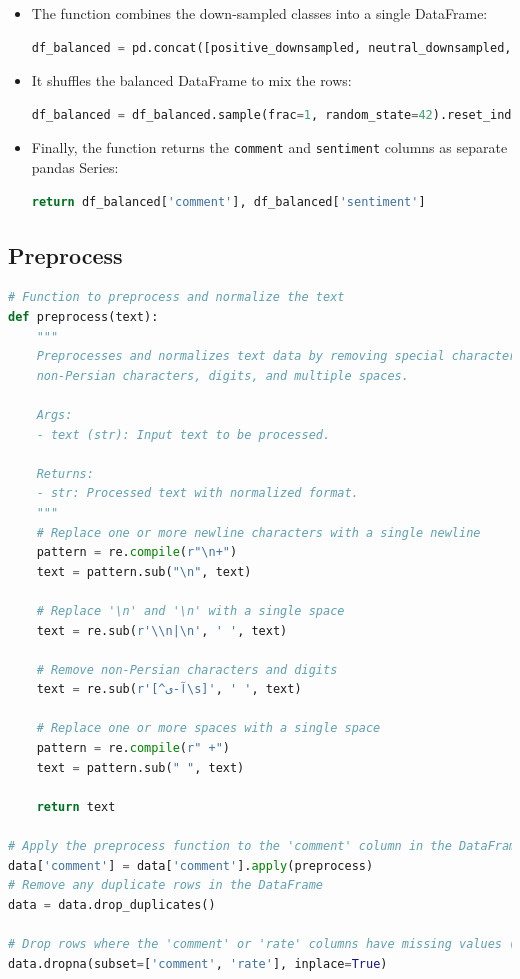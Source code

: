 \documentclass{solutionclass} %
\begin{document}
\begin{solution}
\begin{itemize}
	\item The function combines the down-sampled classes into a single DataFrame:
	\begin{lstlisting}[language=Python]
		df_balanced = pd.concat([positive_downsampled, neutral_downsampled, negative_downsampled])
	\end{lstlisting}
	
	\item It shuffles the balanced DataFrame to mix the rows:
	\begin{lstlisting}[language=Python]
		df_balanced = df_balanced.sample(frac=1, random_state=42).reset_index(drop=True)
	\end{lstlisting}
	
	\item Finally, the function returns the \texttt{comment} and \texttt{sentiment} columns as separate pandas Series:
	\begin{lstlisting}[language=Python]
		return df_balanced['comment'], df_balanced['sentiment']
	\end{lstlisting}
\end{itemize}
\end{solution}




\subsection*{Preprocess}


\begin{lstlisting}[language=Python]
	# Function to preprocess and normalize the text
def preprocess(text):
    """
    Preprocesses and normalizes text data by removing special characters,
    non-Persian characters, digits, and multiple spaces.

    Args:
    - text (str): Input text to be processed.

    Returns:
    - str: Processed text with normalized format.
    """
    # Replace one or more newline characters with a single newline
    pattern = re.compile(r"\n+")
    text = pattern.sub("\n", text)
    
    # Replace '\n' and '\n' with a single space
    text = re.sub(r'\\n|\n', ' ', text)
    
    # Remove non-Persian characters and digits
    text = re.sub(r'[^آ-ی\s]', ' ', text)
    
    # Replace one or more spaces with a single space
    pattern = re.compile(r" +")
    text = pattern.sub(" ", text)
    
    return text

# Apply the preprocess function to the 'comment' column in the DataFrame data
data['comment'] = data['comment'].apply(preprocess)
# Remove any duplicate rows in the DataFrame
data = data.drop_duplicates()

# Drop rows where the 'comment' or 'rate' columns have missing values (NaN)
data.dropna(subset=['comment', 'rate'], inplace=True)
\end{lstlisting}
\end{document}
